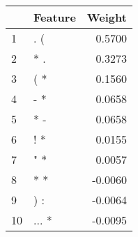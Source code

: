 \begin{tabular}{llr}
\toprule
{} & Feature &  Weight \\
\midrule
1  &     . ( &  0.5700 \\
2  &     * . &  0.3273 \\
3  &     ( * &  0.1560 \\
4  &     - * &  0.0658 \\
5  &     * - &  0.0658 \\
6  &     ! * &  0.0155 \\
7  &     " * &  0.0057 \\
8  &     * * & -0.0060 \\
9  &     ) : & -0.0064 \\
10 &   ... * & -0.0095 \\
\bottomrule
\end{tabular}
